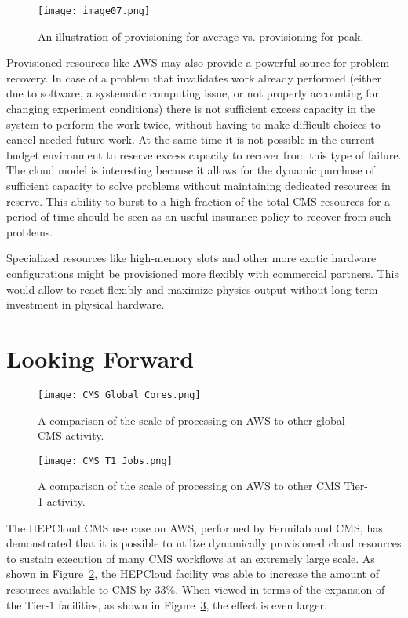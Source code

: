 \documentclass[twocolumn]{svjour3}          %
\begin{document}
\begin{figure}
\centering
 \texttt{[image: image07.png]}
\caption{\label{fig:peak}An illustration of provisioning for average vs. provisioning for peak.}
\end{figure}

Provisioned resources like AWS may also provide a powerful source for problem recovery. In case of a problem that invalidates work already performed (either due to software, a systematic computing issue, or not properly accounting for changing experiment conditions) there is not sufficient excess capacity in the system to perform the work twice, without having to make difficult choices to cancel needed future work. At the same time it is not possible in the current budget environment to reserve excess capacity to recover from this type of failure. The cloud model is interesting because it allows for the dynamic purchase of sufficient capacity to solve problems without maintaining dedicated resources in reserve. This ability to burst to a high fraction of the total CMS resources for a period of time should be seen as an useful insurance policy to recover from such  problems.

Specialized resources like high-memory slots and other more exotic hardware configurations might be provisioned more flexibly with commercial partners. This would allow to react flexibly and maximize physics output without long-term investment in physical hardware.

\section{Looking Forward}

\begin{figure}
\centering
 \texttt{[image: CMS\_Global\_Cores.png]}
\caption{\label{fig:aws_cms_global}A comparison of the scale of processing on AWS to other global CMS activity.}
\end{figure}

\begin{figure}
\centering
 \texttt{[image: CMS\_T1\_Jobs.png]}
\caption{\label{fig:aws_t1}A comparison of the scale of processing on AWS to other CMS Tier-1 activity.}
\end{figure}


The HEPCloud CMS use case on AWS, performed by Fermilab and CMS, has demonstrated that it is possible to utilize dynamically provisioned cloud resources to sustain execution of many CMS workflows at an extremely large scale. As shown in Figure~\ref{fig:aws_cms_global},
the HEPCloud facility was able to increase the amount of resources available to CMS by 33\%. When viewed in terms of the
expansion of the Tier-1 facilities, as shown in Figure~\ref{fig:aws_t1}, the effect is even larger.
\end{document}
